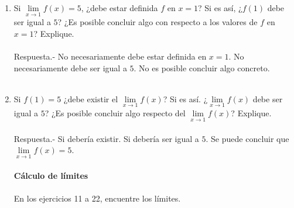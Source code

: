 \begin{enumerate}
\item Si $\lim\limits_{x\to 1} f(x) = 5$, ¿debe estar definida $f$ en $x = 1$? Si es así, ¿$f(1)$ debe ser igual a $5$? ¿Es posible concluir algo con respecto a los valores de $f$ en $x = 1$? Explique.\\\\
    Respuesta.-\; No necesariamente debe estar definida en $x=1$. No necesariamente debe ser igual a $5$. No es posible concluir algo concreto.\\\\

\item Si $f(1)=5$ ¿debe existir el $\lim\limits_{x\to 1} f(x)$? Si es así. ¿$\lim\limits_{x\to 1} f(x)$ debe ser igual a $5$? ¿Es posible concluir algo respecto del $\lim\limits_{x\to 1} f(x)$? Explique.\\\\
    Respuesta.-\; Si debería existir. Si debería ser igual a $5$. Se puede concluir que $\lim\limits_{x\to 1} f(x) = 5$.\\\\

\textbf{Cálculo de límites}\\\\
En los ejercicios 11 a 22, encuentre los límites.\\\\

\end{enumerate}
